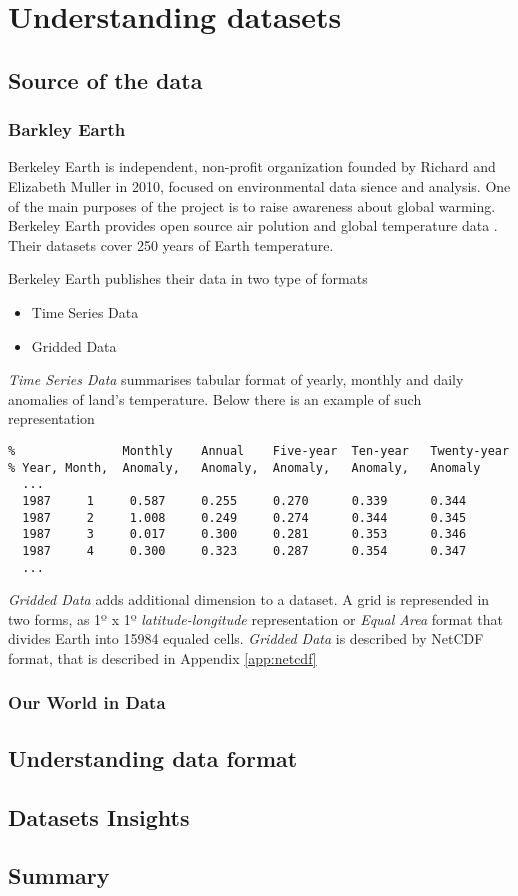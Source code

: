 \chapter{Understanding datasets}

\section{Source of the data}

\subsection{Barkley Earth}

Berkeley Earth is independent, non-profit organization founded by Richard and Elizabeth Muller in 2010, focused on environmental data sience and analysis. 
One of the main purposes of the project is to raise awareness about global warming. 
Berkeley Earth provides open source air polution and global temperature data \cite{berkeleyearthdata}. 
Their datasets cover 250 years of Earth temperature.

Berkeley Earth publishes their data in two type of formats
\begin{itemize}
    \item Time Series Data
    \item Gridded Data
\end{itemize}

{\it Time Series Data} summarises tabular format of yearly, monthly and daily anomalies of land's temperature. 
Below there is an example of such representation
\begin{verbatim}
%               Monthly    Annual    Five-year  Ten-year   Twenty-year
% Year, Month,  Anomaly,   Anomaly,  Anomaly,   Anomaly,   Anomaly
  ...
  1987     1     0.587     0.255     0.270      0.339      0.344
  1987     2     1.008     0.249     0.274      0.344      0.345
  1987     3     0.017     0.300     0.281      0.353      0.346
  1987     4     0.300     0.323     0.287      0.354      0.347
  ...
\end{verbatim}

{\it Gridded Data} adds additional dimension to a dataset. A grid is represended in two forms, as 1º x 1º {\it latitude-longitude} representation or {\it Equal Area} format that divides Earth into 15984 equaled cells.
{\it Gridded Data} is described by NetCDF format, that is described in Appendix \ref{app:netcdf}

\subsection{Our World in Data}

\section{Understanding data format}

\section{Datasets Insights}

\section{Summary}
